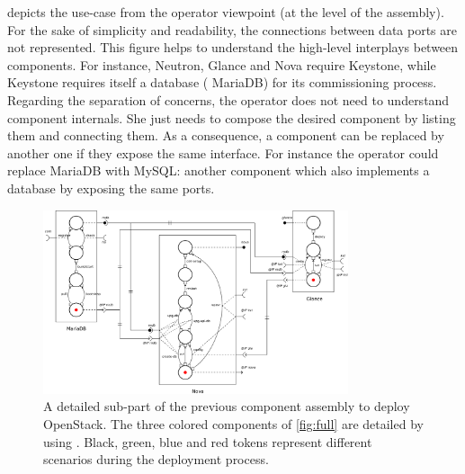  depicts the use-case from the operator viewpoint (\ie at the
level of the \mad assembly). For the sake of simplicity and readability, the
connections between data ports are not represented. This figure helps to
understand the high-level interplays between components. For instance, Neutron,
Glance and Nova require Keystone, while Keystone requires itself a database (\ie
MariaDB) for its commissioning process.
Regarding the separation of concerns, the operator does not need to understand
component internals. She just needs to compose the desired component by listing
them and connecting them. As a consequence, a component can be replaced by
another one if they expose the same interface. For instance the operator could
replace MariaDB with MySQL: another component which also implements a database
by exposing the same ports.

\begin{figure}[t]
  \begin{center}
    \includegraphics[width=0.8\textwidth]{./images/sub.pdf}
    \caption{A detailed sub-part of the previous component assembly to deploy
    OpenStack. The three colored components of \cref{fig:full} are detailed by
    using \mad. Black, green, blue and red tokens represent different scenarios
    during the deployment process.}
    \label{fig:sub}
  \end{center}
\end{figure}


